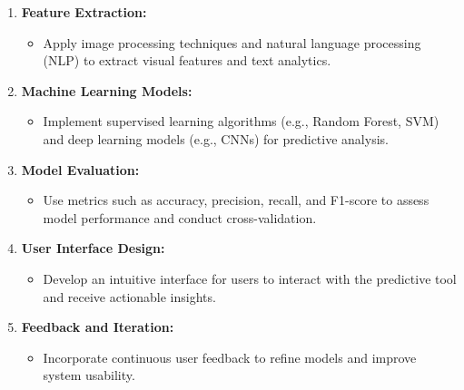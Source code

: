 \documentclass[12pt]{article}
\begin{document}
\begin{enumerate}
\begin{enumerate}
                               \item \textbf{Feature Extraction:}
                               \begin{itemize}
                                   \item Apply image processing techniques and natural language processing (NLP) to extract visual features and text analytics.
                               \end{itemize}

                               \item \textbf{Machine Learning Models:}
                               \begin{itemize}
                                   \item Implement supervised learning algorithms (e.g., Random Forest, SVM) and deep learning models (e.g., CNNs) for predictive analysis.
                               \end{itemize}

                               \item \textbf{Model Evaluation:}
                               \begin{itemize}
                                   \item Use metrics such as accuracy, precision, recall, and F1-score to assess model performance and conduct cross-validation.
                               \end{itemize}

                               \item \textbf{User Interface Design:}
                               \begin{itemize}
                                   \item Develop an intuitive interface for users to interact with the predictive tool and receive actionable insights.
                               \end{itemize}

                               \item \textbf{Feedback and Iteration:}
                               \begin{itemize}
                                   \item Incorporate continuous user feedback to refine models and improve system usability.
                               \end{itemize}
\end{enumerate}
\end{enumerate}
\end{document}
